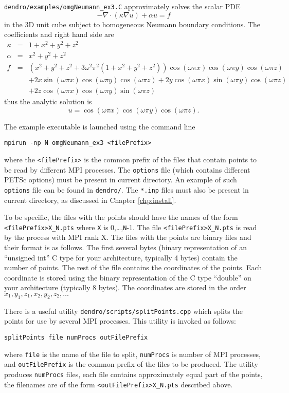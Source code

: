 \documentclass[10pt,reqno,a4paper]{report}
\numberwithin{equation}{section}
\newcommand{\dive}{{\nabla}\cdot}
\begin{document}
\verb'dendro/examples/omgNeumann_ex3.C' approximately solves the scalar PDE
\begin{equation*}
-\dive\left(\kappa \nabla u\right) + \alpha u  = f %
\end{equation*}
in the 3D unit cube subject to homogeneous Neumann boundary conditions. The coefficients and right hand side are 
\begin{eqnarray*}
\kappa &=&  1+ x^2+y^2+z^2  \\
\alpha &=&  x^2+y^2+z^2     \\
f      &=&  (x^2+y^2+z^2 + 3\omega^2\pi^2(1+x^2+y^2+z^2)) \cos(\omega\pi x) \cos(\omega\pi y)\cos(\omega\pi z)  \\
&& +2x \sin(\omega\pi x) \cos(\omega\pi y)\cos(\omega\pi z) + 2y \cos(\omega\pi x) \sin(\omega\pi y)\cos(\omega\pi z)\\
&& + 2z \cos(\omega\pi x) \cos(\omega\pi y)\sin(\omega\pi z)
\end{eqnarray*}
thus the analytic solution is
\[
u=\cos(\omega\pi x) \cos(\omega\pi y)\cos(\omega\pi z).
\]

The example executable is launched using the command line
\begin{verbatim}
mpirun -np N omgNeumann_ex3 <filePrefix>
\end{verbatim}
where the \verb|<filePrefix>| is the common prefix of the files that contain points to be read by different 
MPI processes. The \verb'options' file (which contains different PETSc options) must be present in current directory. An example of such \verb'options' file can be found in \verb'dendro/'. The \verb'*.inp' files must also be present in current directory, as discussed in Chapter \ref{chp:install}.

To be specific, the files with the points should have the names of the form \verb?<filePrefix>X_N.pts? where \verb?X? is 0,\dots,\verb|N|-1. The file \verb?<filePrefix>X_N.pts? is read by the process with MPI rank X. The files with the points are binary files and their format is as follows. The first several bytes (binary representation of an ``unsigned int'' C type for your architecture, typically 4 bytes) contain the number of points. The rest of the file contains the coordinates of the points. Each coordinate is stored using the binary representation of the C type ``double'' on your architecture (typically 8 bytes). The coordinates are stored in the order $x_1,y_1,z_1,x_2,y_2,z_2,\ldots$

There is a useful utility \verb'dendro/scripts/splitPoints.cpp' which splits the points for use by several MPI processes. This utility is invoked as follows:
\begin{verbatim}
splitPoints file numProcs outFilePrefix
\end{verbatim}
where \verb|file| is the name of the file to split, \verb|numProcs| is number of MPI processes, and  \verb|outFilePrefix| is the common prefix of the files to be produced. The utility produces \verb|numProcs| files, each file contains approximately equal part of the points, the filenames are of the form \verb?<outFilePrefix>X_N.pts? described above.
\end{document}
